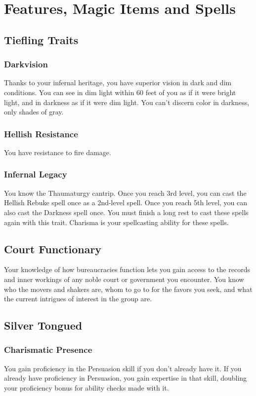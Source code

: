 \documentclass[letterpaper,openany,oneside,twocolumn]{book}
\begin{document}
\clearpage

\chapter*{Features, Magic Items and Spells}

\section*{Tiefling Traits}
\subsection*{Darkvision}
Thanks to your infernal heritage, you have superior vision in dark and dim conditions. You can see in dim light within 60 feet of you as if it were bright light, and in darkness as if it were dim light. You can’t discern color in darkness, only shades of gray.
\subsection*{Hellish Resistance}
You have resistance to fire damage.
\subsection*{Infernal Legacy}
You know the Thaumaturgy cantrip. Once you reach 3rd level, you can cast the Hellish Rebuke spell once as a 2nd-level spell. Once you reach 5th level, you can also cast the Darkness spell once. You must finish a long rest to cast these spells again with this trait. Charisma is your spellcasting ability for these spells.

\section*{Court Functionary}
Your knowledge of how bureaucracies function lets you gain access to the records and inner workings of any noble court or government you encounter. You know who the movers and shakers are, whom to go to for the favors you seek, and what the current intrigues of interest in the group are.

\section*{Silver Tongued}
\subsection*{Charismatic Presence}
You gain proficiency in the Persuasion skill if you don't already have it. If you already have proficiency in Persuasion, you gain expertise in that skill, doubling your proficiency bonus for ability checks made with it.
\end{document}
